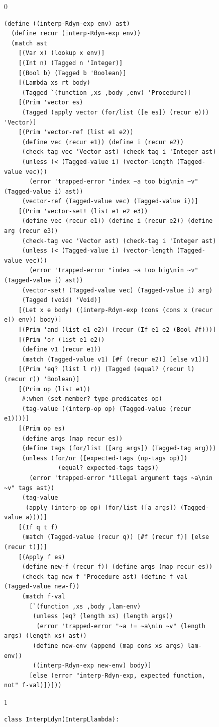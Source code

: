 \documentclass[7x10,nocrop]{TimesAPriori_MIT}%
\def\racketEd{0}
\def\pythonEd{1}
\def\edition{0}
\begin{document}
\begin{figure}[tbp]
{\if\edition\racketEd
\begin{lstlisting}[basicstyle=\ttfamily\footnotesize]
(define ((interp-Rdyn-exp env) ast)
  (define recur (interp-Rdyn-exp env))
  (match ast
    [(Var x) (lookup x env)]
    [(Int n) (Tagged n 'Integer)]
    [(Bool b) (Tagged b 'Boolean)]
    [(Lambda xs rt body)
     (Tagged `(function ,xs ,body ,env) 'Procedure)]
    [(Prim 'vector es)
     (Tagged (apply vector (for/list ([e es]) (recur e))) 'Vector)]
    [(Prim 'vector-ref (list e1 e2))
     (define vec (recur e1)) (define i (recur e2))
     (check-tag vec 'Vector ast) (check-tag i 'Integer ast)
     (unless (< (Tagged-value i) (vector-length (Tagged-value vec)))
       (error 'trapped-error "index ~a too big\nin ~v" (Tagged-value i) ast))
     (vector-ref (Tagged-value vec) (Tagged-value i))]
    [(Prim 'vector-set! (list e1 e2 e3))
     (define vec (recur e1)) (define i (recur e2)) (define arg (recur e3))
     (check-tag vec 'Vector ast) (check-tag i 'Integer ast)
     (unless (< (Tagged-value i) (vector-length (Tagged-value vec)))
       (error 'trapped-error "index ~a too big\nin ~v" (Tagged-value i) ast))
     (vector-set! (Tagged-value vec) (Tagged-value i) arg)
     (Tagged (void) 'Void)]
    [(Let x e body) ((interp-Rdyn-exp (cons (cons x (recur e)) env)) body)]
    [(Prim 'and (list e1 e2)) (recur (If e1 e2 (Bool #f)))]
    [(Prim 'or (list e1 e2))
     (define v1 (recur e1))
     (match (Tagged-value v1) [#f (recur e2)] [else v1])]
    [(Prim 'eq? (list l r)) (Tagged (equal? (recur l) (recur r)) 'Boolean)]
    [(Prim op (list e1))
     #:when (set-member? type-predicates op)
     (tag-value ((interp-op op) (Tagged-value (recur e1))))]
    [(Prim op es)
     (define args (map recur es))
     (define tags (for/list ([arg args]) (Tagged-tag arg)))
     (unless (for/or ([expected-tags (op-tags op)])
               (equal? expected-tags tags))
       (error 'trapped-error "illegal argument tags ~a\nin ~v" tags ast))
     (tag-value
      (apply (interp-op op) (for/list ([a args]) (Tagged-value a))))]
    [(If q t f)
     (match (Tagged-value (recur q)) [#f (recur f)] [else (recur t)])]
    [(Apply f es)
     (define new-f (recur f)) (define args (map recur es))
     (check-tag new-f 'Procedure ast) (define f-val (Tagged-value new-f))
     (match f-val 
       [`(function ,xs ,body ,lam-env)
        (unless (eq? (length xs) (length args))
         (error 'trapped-error "~a != ~a\nin ~v" (length args) (length xs) ast))
        (define new-env (append (map cons xs args) lam-env))
        ((interp-Rdyn-exp new-env) body)]
       [else (error "interp-Rdyn-exp, expected function, not" f-val)])]))
\end{lstlisting}
\fi}
{\if\edition\pythonEd
\begin{lstlisting}[basicstyle=\ttfamily\footnotesize]
class InterpLdyn(InterpLlambda):
  

\end{lstlisting}}
\end{figure}
\end{document}
